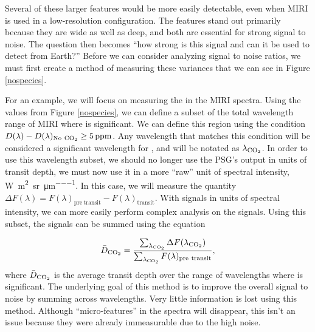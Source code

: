 Several of these larger features would be more easily detectable, even when MIRI
 is used in a low-resolution configuration. The features stand out primarily
 because they are wide as well as deep, and both are essential for strong signal
 to noise. The question then becomes ``how strong is this signal and can it be
 used to detect  from Earth?'' Before we can consider analyzing
 signal to noise ratios, we must first create a method of measuring these
 variances that we can see in Figure \ref{nospecies}.

For an example, we will focus on measuring the  in the MIRI spectra.
 Using the values from Figure \ref{nospecies}, we can define a subset of
 the total wavelength range of MIRI where  is significant. We can
 define this region using the condition
 $D(\lambda) - D(\lambda)_{\mathrm{No\ \mathrm{CO_2}}} \geq 5\,\mathrm{ppm}$. Any
 wavelength that matches this condition will be considered a significant
 wavelength for
 , and will be notated as $\lambda_{\mathrm{CO_2}}$. In order to use
 this wavelength subset, we should no longer use
 the PSG's output in units of transit depth, we must now use it in a more
 ``raw'' unit of spectral intensity,
 \si{\watt\per\meter^2\per\steradian\per\micro\meter}.
 In this case, we will measure the quantity $\Delta F(\lambda)=F(\lambda)_
 \mathrm{pre\ transit} - F(\lambda)_\mathrm{transit}$. With signals in units of
 spectral intensity, we can more easily perform complex analysis on the signals.
 Using this subset, the signals can be summed using the equation

\begin{equation}
    \bar{D}_{\mathrm{CO_2}} = \frac{\sum_{\lambda_{\mathrm{CO_2}}}
    \Delta F(\lambda_{\mathrm{CO_2}})}
    {\sum_{\lambda_{\mathrm{CO_2}}} F(\lambda)_\mathrm{pre\ transit}},
    \label{reductionfunction}
\end{equation}
where $\bar{D}_{\mathrm{CO_2}}$ is the average transit depth over the range of
 wavelengths where  is significant. The underlying
 goal of this method is to improve the overall signal to noise by summing across
 wavelengths. Very little information is lost using this method. Although
 ``micro-features'' in the spectra will disappear, this isn't an issue because
 they were already immeasurable due to the high noise.

